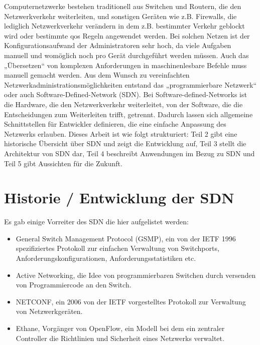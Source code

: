 \documentclass[twoside,12pt]{scrartcl}
\begin{document}
	
	Computernetzwerke bestehen traditionell aus Switchen und Routern, die den Netzwerkverkehr weiterleiten, und sonstigen Geräten wie z.B. Firewalls, die lediglich Netzwerkverkehr verändern in dem z.B. bestimmter Verkehr geblockt wird oder bestimmte qos Regeln angewendet werden. Bei solchen Netzen ist der Konfigurationsaufwand der Administratoren sehr hoch, da viele Aufgaben manuell und womöglich noch pro Gerät durchgeführt werden müssen. Auch das „Übersetzen“ von komplexen Anforderungen in maschinenlesbare Befehle muss manuell gemacht werden.
Aus dem Wunsch zu vereinfachten Netzwerkadministrationsmöglichkeiten entstand das „programmierbare Netzwerk“ oder auch Software-Defined-Network (SDN). Bei Software-defined-Networks ist die Hardware, die den Netzwerkverkehr weiterleitet, von der Software, die die Entscheidungen zum Weiterleiten trifft, getrennt. Dadurch lassen sich allgemeine Schnittstellen für Entwickler definieren, die eine einfache Anpassung des Netzwerks erlauben.
Dieses Arbeit ist wie folgt strukturiert: Teil 2 gibt eine historische Übersicht über SDN und zeigt die Entwicklung auf, Teil 3 stellt die Architektur von SDN dar, Teil 4 beschreibt Anwendungen im Bezug zu SDN und Teil 5 gibt Aussichten für die Zukunft.
	\section{Historie / Entwicklung der SDN}
	
	Es gab einige Vorreiter des SDN die hier aufgelistet werden:
	
	\begin{itemize}
		\item General Switch Management Protocol (GSMP), ein von der IETF 1996 spezifiziertes Protokoll zur einfachen Verwaltung von Switchports, Anforderungskonfigurationen, Anforderungsstatistiken etc.
		\item Active Networking, die Idee von programmierbaren Switchen durch versenden von Programmiercode an den Switch.
		\item NETCONF, ein 2006 von der IETF vorgestelltes Protokoll zur Verwaltung von Netzwerkgeräten.
		\item Ethane, Vorgänger von OpenFlow, ein Modell bei dem ein zentraler Controller die Richtlinien und Sicherheit eines Netzwerks verwaltet.
	\end{itemize}
	
\end{document}
